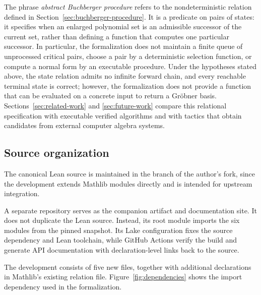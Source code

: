 The phrase \emph{abstract Buchberger procedure} refers to the
nondeterministic relation defined in Section~\ref{sec:buchberger-procedure}.
It is a predicate on pairs of states: it specifies when an enlarged polynomial
set is an admissible successor of the current set, rather than defining a
function that computes one particular successor.  In particular, the
formalization does not maintain a finite queue of unprocessed critical pairs,
choose a pair by a deterministic selection function, or compute a normal form
by an executable procedure.  Under the hypotheses stated above, the state
relation admits no infinite forward chain, and every reachable terminal state
is correct; however, the formalization does not provide a function that can be
evaluated on a concrete input to return a Gr\"obner basis.
Sections~\ref{sec:related-work} and \ref{sec:future-work} compare this
relational specification with executable verified algorithms and with tactics
that obtain candidates from external computer algebra systems.

\subsection{Source organization}

The canonical Lean source is maintained in the
 branch of the author's  fork,
since the development extends Mathlib modules directly and is intended for
upstream integration.

A separate  repository serves as the companion artifact and
documentation site.  It does not duplicate the Lean source.  Instead, its root
module  imports the six modules from the pinned
 snapshot.  Its Lake configuration fixes the source dependency
and Lean toolchain, while GitHub Actions verify the build and generate
 API documentation with declaration-level links back to the
source.

The development consists of five new files, together with additional
declarations in Mathlib's existing relation file.
Figure~\ref{fig:dependencies} shows the import dependency used in the
formalization.


